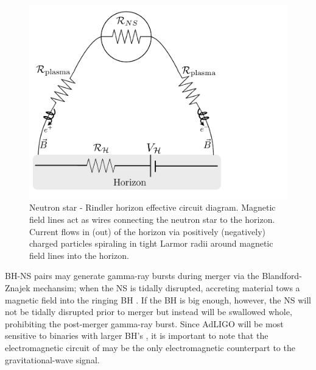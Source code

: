 \begin{figure}
\begin{center}
\includegraphics[scale=0.35]{figures/ch6/BHNS_CircuitDiagram.pdf} 
\end{center}
\caption{Neutron star - Rindler horizon effective circuit
  diagram. Magnetic field lines act as wires connecting the neutron
  star to the horizon. Current flows in (out) of the horizon via 
  positively (negatively) charged particles spiraling in tight Larmor radii around magnetic field lines into the horizon. }
\label{CircuitDiagram}
\end{figure}

BH-NS pairs may generate gamma-ray bursts
during merger via the Blandford-Znajek mechansim; 
when the NS is tidally disrupted, accreting
material tows a magnetic field into the ringing BH \citep{NarayanPacz:1992, LeeRuiz:2005, FaberBaumgarte:2006, ShibataUryu:2007, ShibataTaniguchi:2008, Etienne:2009, Rezzolla:2011, Etienne:2012, EastPret:2012, Giacomazzo:2013}. 
If the BH is big enough, however, the NS will not be tidally
disrupted prior to merger but instead will be swallowed whole,
prohibiting the post-merger gamma-ray burst. 
Since AdLIGO will be most sensitive to binaries with larger BH's
\citep{AdLIGO:2012}, it is important to note that the electromagnetic circuit of 
\citep{McL:2011} may be the only electromagnetic counterpart to
the gravitational-wave signal.


